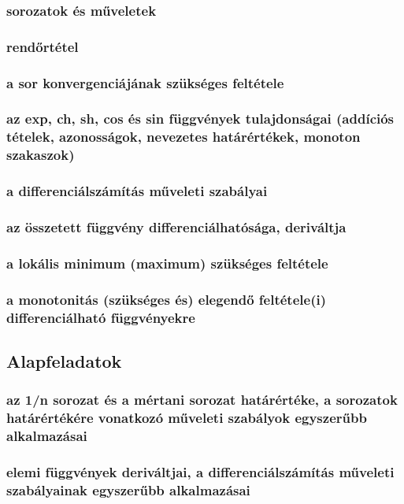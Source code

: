 \documentclass[12pt]{article}
\begin{document}
\subsubsection{sorozatok és műveletek}
\subsubsection{rendőrtétel}
\subsubsection{a sor konvergenciájának szükséges feltétele}
\subsubsection{az exp, ch, sh, cos és sin függvények tulajdonságai (addíciós tételek, azonosságok, nevezetes határértékek, monoton szakaszok)}
\subsubsection{a differenciálszámítás műveleti szabályai}
\subsubsection{az összetett függvény differenciálhatósága, deriváltja}
\subsubsection{a lokális minimum (maximum) szükséges feltétele}
\subsubsection{a monotonitás (szükséges és) elegendő feltétele(i) differenciálható függvényekre}
 



\subsection{Alapfeladatok}

\subsubsection{az 1/n sorozat és a mértani sorozat határértéke, a sorozatok határértékére vonatkozó műveleti szabályok egyszerűbb alkalmazásai}
\subsubsection{elemi függvények deriváltjai, a differenciálszámítás műveleti szabályainak egyszerűbb alkalmazásai}
\end{document}
